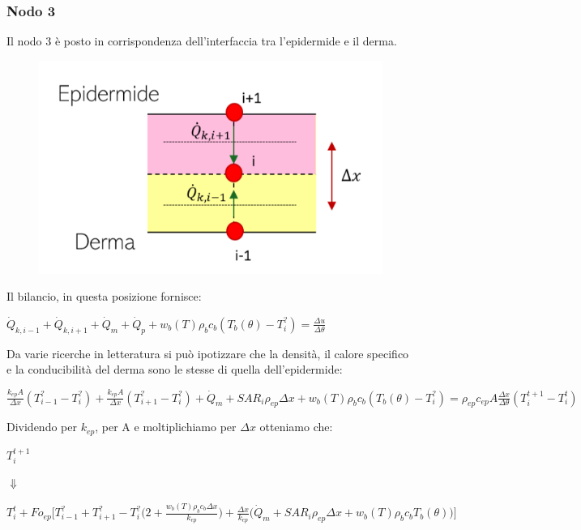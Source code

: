 \subsubsection*{Nodo 3}
Il nodo 3 è posto in corrispondenza dell'interfaccia tra l'epidermide e il derma.
\begin{figure}[H]
    \centering
    \includegraphics[width=.6\textwidth]{Immagini/Nodi/nodo3.png} 
    \label{nodo3}
\end{figure}
\noindent
Il bilancio, in questa posizione fornisce:
\begin{center}
	$ \Dot{Q} _{k, i-1} +\Dot{Q} _{k, i+1}+ \Dot{Q} _{m} +\Dot{Q} _{p}+ w_b (T) \rho _b c_b (T_b(\theta)-T_i ^?)= \frac{\Delta u}{\Delta \theta} $
\end{center}
Da varie ricerche in letteratura si può ipotizzare che la densità, il calore specifico  e la conducibilità del derma sono le stesse di quella dell'epidermide:
\begin{center}
	$ \frac{k_{ep} A }{\Delta x}(T_{i-1} ^? - T_i ^? ) + \frac{k_{ep} A }{\Delta x}(T_{i+1} ^? - T_i ^? )+ \Dot{Q} _{m} + SAR_i \rho _{ep} \Delta x + w_b (T) \rho _b c_b (T_b(\theta)-T_i ^?) = \rho _{ep} c_{ep} A \frac{\Delta x}{ \Delta \theta}(T_i ^{t+1} - T_i ^t )$
\end{center}
\newpage
\noindent
Dividendo per $k_{ep}$, per A e moltiplichiamo per $\Delta x$ otteniamo che:
\begin{center}
	$T_i ^{t+1} $
\end{center}
\begin{center}
	$\Downarrow$
\end{center}
\begin{center}
	$T_i ^t + Fo_{ep} \Bigg[ T_{i-1} ^? + T_{i+1} ^?- T_i ^? \Big(2 + \frac{ w_b (T) \rho _b c_b \Delta x }{k_{ep}} \Big) +  \frac{\Delta x }{k_{ep}} \Big(\Dot{Q} _{m} +  SAR_i \rho _{ep} \Delta x + w_b (T) \rho _b c_b T_b(\theta)\Big) \Bigg]$
\end{center}

